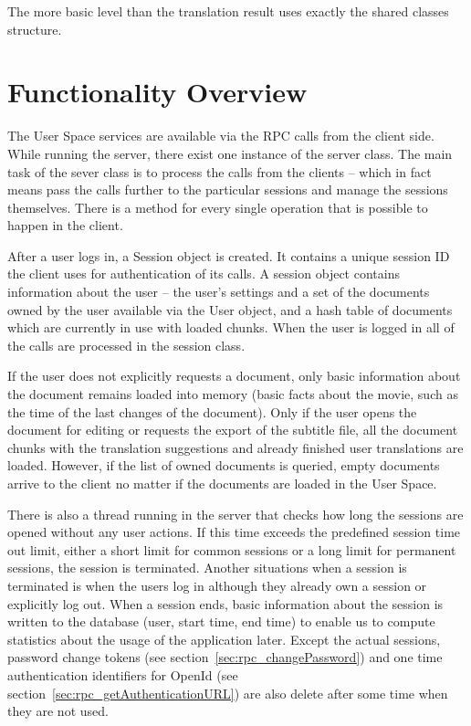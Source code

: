 The more basic level than the translation result uses exactly the shared classes structure.

\section{Functionality Overview}

The User Space services are available via the RPC calls from the client side. While running the server, there exist one instance of the server class. The main task of the sever class is to process the calls from the clients -- which in fact means pass the calls further to the particular sessions and manage the sessions themselves. There is a method for every single operation that is possible to happen in the client.

After a user logs in, a Session object is created. It contains a unique session ID the client uses for authentication of its calls. A session object contains information about the user -- the user's settings and a set of the documents owned by the user available via the User object, and a hash table of documents which are currently in use with loaded chunks. When the user is logged in all of the calls are processed in the session class.

If the user does not explicitly requests a document, only basic information about the document remains loaded into memory (basic facts about the movie, such as the time of the last changes of the document). Only if the user opens the document for editing or requests the export of the subtitle file, all the document chunks with the translation suggestions and already finished user translations are loaded. However, if the list of owned documents is queried, empty documents arrive to the client no matter if the documents are loaded in the User Space.

There is also a thread running in the server that checks how long the sessions are opened without any user actions. If this time exceeds the predefined session time out limit, either a short limit for common sessions or a long limit for permanent sessions, the session is terminated. Another situations when a session is terminated is when the users log in although they already own a session or explicitly log out. When a session ends, basic information about the session is written to the database (user, start time, end time) to enable us to compute statistics about the usage of the application later. Except the actual sessions, password change tokens (see section~\ref{sec:rpc_changePassword}) and one time authentication identifiers for OpenId (see section~\ref{sec:rpc_getAuthenticationURL}) are also delete after some time when they are not used.

